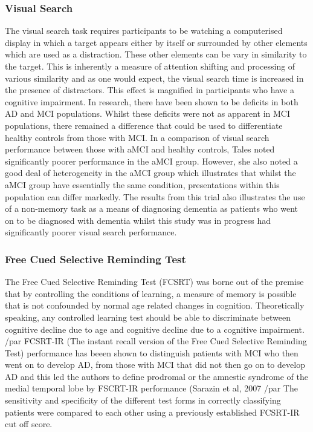 \documentclass[12pt, twoside, a4paper]{article}
\begin{document}
\subsubsection{Visual Search}
The visual search task requires participants to be watching a computerised display in which a target appears either by itself or surrounded by other elements which are used as a distraction. These other elements can be vary in similarity to the target. This is inherently a measure of attention shifting and processing of various similarity and as one would expect, the visual search time is increased in the presence of distractors. This effect is magnified in participants who have a cognitive impairment. 
In research, there have been shown to be deficits in both AD and MCI populations. Whilst these deficits were not as apparent in MCI populations, there remained a difference that could be used to differentiate healthy controls from those with MCI.
In a comparison of visual search performance between those with aMCI and healthy controls, Tales noted significantly poorer performance in the aMCI group. However, she also noted a good deal of heterogeneity in the aMCI group which illustrates that whilst the aMCI group have essentially the same condition, presentations within this population can differ markedly. The results from this trial also illustrates the use of a non-memory task as a means of diagnosing dementia as patients who went on to be diagnosed with dementia whilst this study was in progress had significantly poorer visual search performance.  
\subsubsection{Free Cued Selective Reminding Test}
The Free Cued Selective Reminding Test (FCSRT) was borne out of the premise that by controlling the conditions of learning, a measure of memory is possible that is not confounded by normal age related changes in cognition. Theoretically speaking, any controlled learning test should be able to discriminate between cognitive decline due to age and cognitive decline due to a cognitive impairment.
/par
FCSRT-IR (The instant recall version of the Free Cued Selective Reminding Test) performance has beeen shown to distinguish patients with MCI who then went on to develop AD, from those with MCI that did not then go on to develop AD and this led the authors to define prodromal or the amnestic syndrome of the medial temporal lobe by FSCRT-IR performance (Sarazin et al, 2007 
/par
The sensitivity and specificity of the different test forms in correctly classifying patients were compared to each other using a previously established FCSRT-IR cut off score. 
\end{document}
